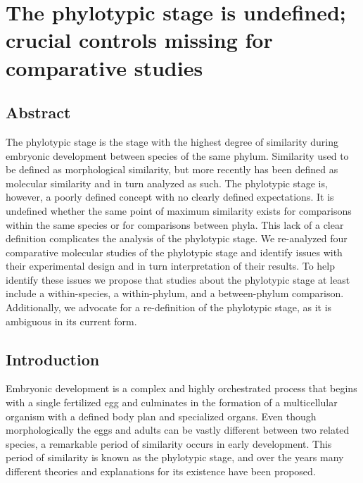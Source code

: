 \chapter{The phylotypic stage is undefined; crucial controls missing for comparative studies}\thumbforchapter
{}
\newpage

\section{Abstract}

The phylotypic stage is the stage with the highest degree of similarity during embryonic development between species of the same phylum. Similarity used to be defined as morphological similarity, but more recently has been defined as molecular similarity and in turn analyzed as such. The phylotypic stage is, however, a poorly defined concept with no clearly defined expectations. It is undefined whether the same point of maximum similarity exists for comparisons within the same species or for comparisons between phyla. This lack of a clear definition complicates the analysis of the phylotypic stage. We re-analyzed four comparative molecular studies of the phylotypic stage and identify issues with their experimental design and in turn interpretation of their results. To help identify these issues we propose that studies about the phylotypic stage at least include a within-species, a within-phylum, and a between-phylum comparison. Additionally, we advocate for a re-definition of the phylotypic stage, as it is ambiguous in its current form.

\section{Introduction}

Embryonic development is a complex and highly orchestrated process that begins with a single fertilized egg and culminates in the formation of a multicellular organism with a defined body plan and specialized organs. Even though morphologically the eggs and adults can be vastly different between two related species, a remarkable period of similarity occurs in early development. This period of similarity is known as the phylotypic stage, and over the years many different theories and explanations for its existence have been proposed\cite{Kalinka2012,Irie2014,Drost2017}.  

